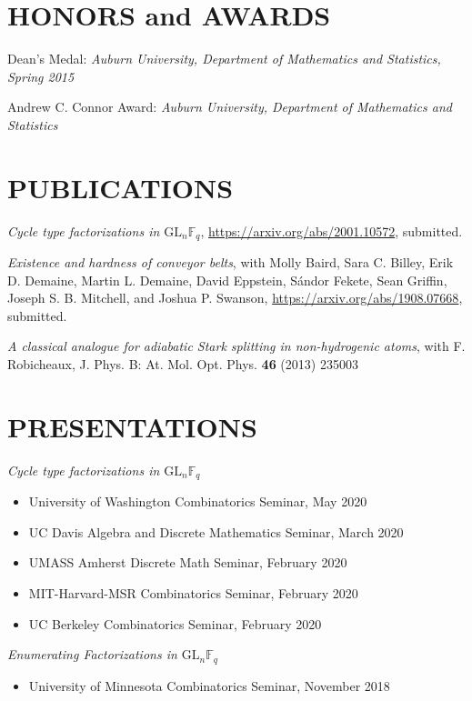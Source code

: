\documentclass{res}
\begin{document}
\begin{resume}
\section{HONORS and AWARDS}
	\vspace{2mm}

Dean's Medal: \textit{Auburn University, Department of Mathematics and Statistics, Spring 2015}

Andrew C. Connor Award: \textit{Auburn University, Department of Mathematics and Statistics}

\section{PUBLICATIONS}
  \vspace{2mm}

{\it Cycle type factorizations in \(\mathrm{GL}_n \mathbb{F}_q\)},
\url{https://arxiv.org/abs/2001.10572},
submitted.

{\it Existence and hardness of conveyor belts},
with Molly Baird, Sara C. Billey, Erik D. Demaine, Martin L. Demaine, David Eppstein, S\'andor Fekete, Sean Griffin, Joseph S. B. Mitchell, and Joshua P. Swanson,
\url{https://arxiv.org/abs/1908.07668},
submitted.

{\it A classical analogue for adiabatic Stark splitting in non-hydrogenic atoms},
with F. Robicheaux,
J. Phys. B: At. Mol. Opt. Phys. {\bf 46} (2013) 235003

\section{PRESENTATIONS}
  \vspace{2mm}
{\it Cycle type factorizations in \(\mathrm{GL}_n \mathbb{F}_q\)}
\begin{itemize}
\item University of Washington Combinatorics Seminar, May 2020
\item UC Davis Algebra and Discrete Mathematics Seminar, March 2020
\item UMASS Amherst Discrete Math Seminar, February 2020
\item MIT-Harvard-MSR Combinatorics Seminar, February 2020
\item UC Berkeley Combinatorics Seminar, February 2020
\end{itemize}

{\it Enumerating Factorizations in \(\mathrm{GL}_n \mathbb{F}_q\)}
\begin{itemize}
\item University of Minnesota Combinatorics Seminar, November 2018
\end{itemize}


\end{resume}
\end{document}

